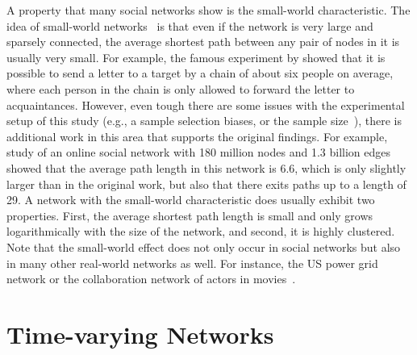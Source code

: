 A property that many social networks show is the small-world characteristic.
The idea of small-world networks~\cite{Watts1999} is that even if the network is very large and sparsely connected, the average shortest path between any pair of nodes in it is usually very small.
For example, the famous experiment by \citet{Milgram1969} showed that it is possible to send a letter to a target by a chain of about six people on average, where each person in the chain is only allowed to forward the letter to acquaintances.
However, even tough there are some issues with the experimental setup of this study (e.g., a sample selection biases, or the sample size~\cite{Schnettler2009}), there is additional work in this area that supports the original findings.
For example, \citet{Leskovec2008} study of an online social network with 180 million nodes and 1.3 billion edges showed that the average path length in this network is 6.6, which is only slightly larger than in the original work, but also that there exits paths up to a length of 29.
A network with the small-world characteristic does usually exhibit two properties.
First, the average shortest path length is small and only grows logarithmically with the size of the network, and second, it is highly clustered.
Note that the small-world effect does not only occur in social networks but also in many other real-world networks as well.
For instance, the US power grid network or the collaboration network of actors in movies~\cite{Watts1998}.




\section{Time-varying Networks}
\label{sec:time-varying-networks}

